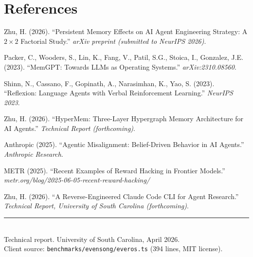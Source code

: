 \documentclass[11pt, a4paper]{article}
\begin{document}
\section*{References}

\begin{enumerate}[label={[\arabic*]}, leftmargin=2em, nosep, font=\small]
  \item Zhu, H. (2026). ``Persistent Memory Effects on AI Agent Engineering Strategy: A $2 \times 2$ Factorial Study.'' \textit{arXiv preprint (submitted to NeurIPS 2026)}.
  \item Packer, C., Wooders, S., Lin, K., Fang, V., Patil, S.G., Stoica, I., Gonzalez, J.E. (2023). ``MemGPT: Towards LLMs as Operating Systems.'' \textit{arXiv:2310.08560}.
  \item Shinn, N., Cassano, F., Gopinath, A., Narasimhan, K., Yao, S. (2023). ``Reflexion: Language Agents with Verbal Reinforcement Learning.'' \textit{NeurIPS 2023}.
  \item Zhu, H. (2026). ``HyperMem: Three-Layer Hypergraph Memory Architecture for AI Agents.'' \textit{Technical Report (forthcoming)}.
  \item Anthropic (2025). ``Agentic Misalignment: Belief-Driven Behavior in AI Agents.'' \textit{Anthropic Research}.
  \item METR (2025). ``Recent Examples of Reward Hacking in Frontier Models.'' \textit{metr.org/blog/2025-06-05-recent-reward-hacking/}
  \item Zhu, H. (2026). ``A Reverse-Engineered Claude Code CLI for Agent Research.'' \textit{Technical Report, University of South Carolina (forthcoming)}.
\end{enumerate}

\vfill
\begin{center}
{\color{faded}\rule{0.4\textwidth}{0.4pt}}\\[6pt]
{\small\sffamily\color{faded} Technical report. University of South Carolina, April 2026.\\
Client source: \texttt{benchmarks/evensong/everos.ts} (394 lines, MIT license).}
\end{center}
\end{document}
